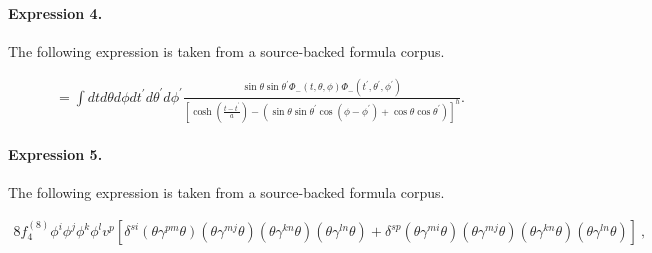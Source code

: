 \documentclass[11pt]{article}
\begin{document}
\paragraph{Expression 4.} The following expression is taken from a source-backed formula corpus.

\begin{align*}= \int dt d\theta d\phi dt^{\prime} d\theta^{\prime} d\phi^{\prime}\frac{\sin\theta\sin\theta^{\prime}\Phi_{-}(t,\theta,\phi)\Phi_{-}(t^{\prime},\theta^{\prime},\phi^{\prime})}{[\cosh(\frac{t-t^{\prime}}{a}) -(\sin \theta \sin\theta^{\prime}\cos (\phi-\phi^{\prime}) + \cos \theta \cos \theta^{\prime})]^{h}}.\end{align*}

\paragraph{Expression 5.} The following expression is taken from a source-backed formula corpus.

\begin{align*}8 f^{(8)}_4 \phi^i \phi^j \phi^k \phi^l v^p \left[ \delta^{si} (\theta \gamma^{pm} \theta) (\theta \gamma^{mj} \theta)(\theta \gamma^{kn} \theta)(\theta \gamma^{ln} \theta) + \delta^{sp} (\theta \gamma^{mi} \theta)(\theta \gamma^{mj} \theta)(\theta \gamma^{kn} \theta)(\theta \gamma^{ln} \theta)\right] ~,\end{align*}
\end{document}
